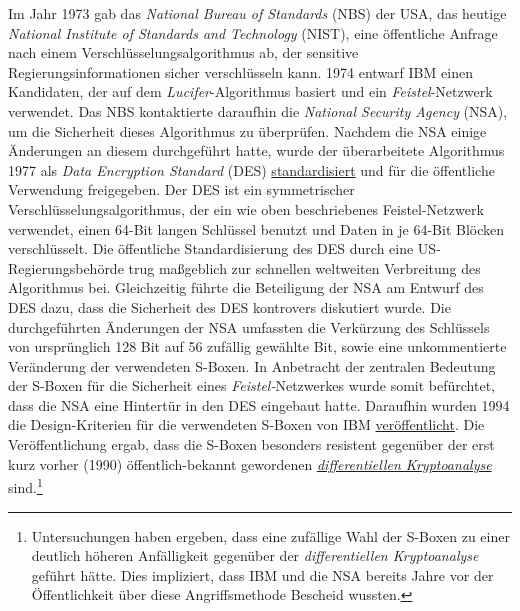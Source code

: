 Im Jahr 1973 gab das \textit{National Bureau of Standards} (NBS) der USA, das heutige \textit{National Institute of Standards and Technology} (NIST), eine öffentliche Anfrage nach einem Verschlüsselungsalgorithmus ab, der sensitive Regierungsinformationen sicher verschlüsseln kann. 1974 entwarf IBM einen Kandidaten, der auf dem \textit{Lucifer}-Algorithmus basiert und ein \textit{Feistel}-Netzwerk verwendet. Das NBS kontaktierte daraufhin die \textit{National Security Agency} (NSA), um die Sicherheit dieses Algorithmus zu überprüfen. Nachdem die NSA einige Änderungen an diesem durchgeführt hatte, wurde der überarbeitete Algorithmus 1977 als \textit{Data Encryption Standard} (DES) \href{http://csrc.nist.gov/publications/fips/archive/fips46-3/fips46-3.pdf}{standardisiert} und für die öffentliche Verwendung freigegeben. Der DES ist ein symmetrischer Verschlüsselungsalgorithmus, der ein wie oben beschriebenes Feistel-Netzwerk verwendet, einen 64-Bit langen Schlüssel benutzt und Daten in je 64-Bit Blöcken verschlüsselt. Die öffentliche Standardisierung des DES durch eine US-Regierungsbehörde trug maßgeblich zur schnellen weltweiten Verbreitung des Algorithmus bei. Gleichzeitig führte die Beteiligung der NSA am Entwurf des DES dazu, dass die Sicherheit des DES kontrovers diskutiert wurde. Die durchgeführten Änderungen der NSA umfassten die Verkürzung des Schlüssels von ursprünglich 128 Bit auf 56 zufällig gewählte Bit, sowie eine unkommentierte Veränderung der verwendeten S-Boxen. In Anbetracht der zentralen Bedeutung der S-Boxen für die Sicherheit eines \textit{Feistel-}Netzwerkes wurde somit befürchtet, dass die NSA eine Hintertür in den DES eingebaut hatte. Daraufhin wurden 1994 die Design-Kriterien für die verwendeten S-Boxen von IBM \href{http://simson.net/ref/1994/coppersmith94.pdf}{veröffentlicht}. Die Veröffentlichung ergab, dass die S-Boxen besonders resistent gegenüber der erst kurz vorher (1990) öffentlich-bekannt gewordenen \hyperref[sssec:diffKryptoanalyse]{\textit{differentiellen Kryptoanalyse}} sind.\footnote{Untersuchungen haben ergeben, dass eine zufällige Wahl der S-Boxen zu einer deutlich höheren Anfälligkeit gegenüber der \textit{differentiellen Kryptoanalyse} geführt hätte. Dies impliziert, dass IBM und die NSA bereits Jahre vor der Öffentlichkeit über diese Angriffsmethode Bescheid wussten.}
\newpage
\bigskip
